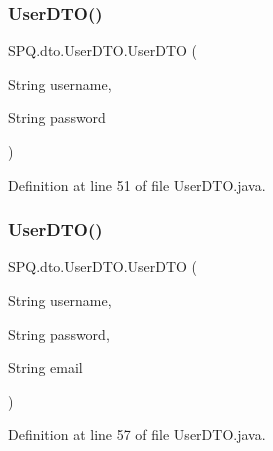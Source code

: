 \subsubsection{\texorpdfstring{User\+D\+T\+O()}{UserDTO()}\hspace{0.1cm}{\footnotesize\ttfamily [8/11]}}
{\footnotesize\ttfamily S\+P\+Q.\+dto.\+User\+D\+T\+O.\+User\+D\+TO (\begin{DoxyParamCaption}\item[{String}]{username,  }\item[{String}]{password }\end{DoxyParamCaption})}



Definition at line 51 of file User\+D\+T\+O.\+java.

\mbox{\label{class_s_p_q_1_1dto_1_1_user_d_t_o_ad7df1249da1b9fdc0b383a4b96b50eae}} 
\subsubsection{\texorpdfstring{User\+D\+T\+O()}{UserDTO()}\hspace{0.1cm}{\footnotesize\ttfamily [9/11]}}
{\footnotesize\ttfamily S\+P\+Q.\+dto.\+User\+D\+T\+O.\+User\+D\+TO (\begin{DoxyParamCaption}\item[{String}]{username,  }\item[{String}]{password,  }\item[{String}]{email }\end{DoxyParamCaption})}



Definition at line 57 of file User\+D\+T\+O.\+java.

\mbox{\label{class_s_p_q_1_1dto_1_1_user_d_t_o_ad9a6a079da473fe91114b91f0383196f}} 
